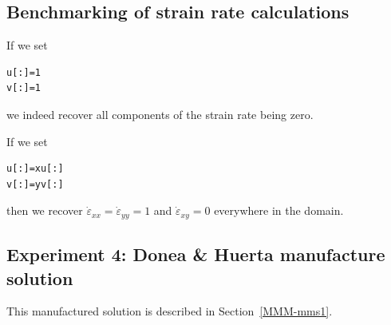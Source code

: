 \subsection*{Benchmarking of strain rate calculations}

If we set 
\begin{lstlisting}
u[:]=1
v[:]=1
\end{lstlisting}
we indeed recover all components of the strain rate being zero.

If we set 
\begin{lstlisting}
u[:]=xu[:]
v[:]=yv[:]
\end{lstlisting}
then we recover $\dot{\varepsilon}_{xx}=\dot{\varepsilon}_{yy}=1$
and $\dot{\varepsilon}_{xy}=0$ everywhere in the domain.

\newpage
\subsection*{Experiment 4: Donea \& Huerta manufacture solution}

This manufactured solution is described in Section~\ref{MMM-mms1}.

